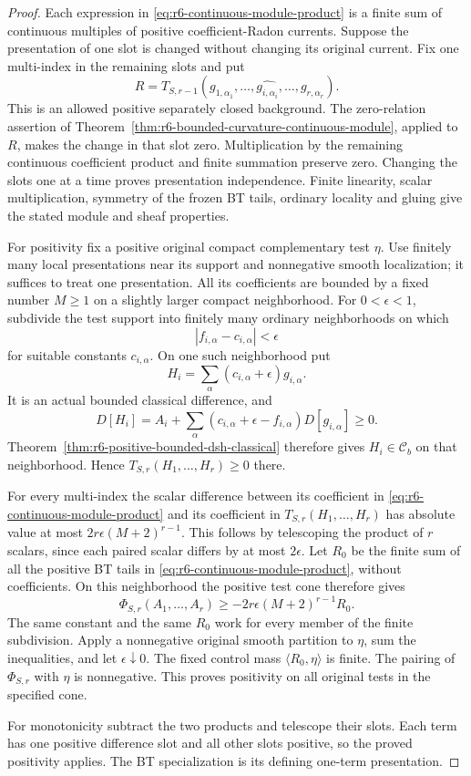 \documentclass[11pt,a4paper]{article}
\numberwithin{equation}{section}
\theoremstyle{definition}
\theoremstyle{remark}
\begin{document}
\begin{proof}
Each expression in \eqref{eq:r6-continuous-module-product} is a finite
sum of continuous multiples of positive coefficient-Radon currents.
Suppose the presentation of one slot is changed without changing its
original current. Fix one multi-index in the remaining slots and put
\[
 R=T_{S,r-1}(g_{1,\alpha_1},\ldots,
              \widehat{g_{i,\alpha_i}},\ldots,g_{r,\alpha_r}).
\]
This is an allowed positive separately closed background. The
zero-relation assertion of
Theorem~\ref{thm:r6-bounded-curvature-continuous-module}, applied to
$R$, makes the change in that slot zero. Multiplication by the
remaining continuous coefficient product and finite summation
preserve zero. Changing the slots one at a time proves presentation
independence. Finite linearity, scalar multiplication, symmetry of
the frozen BT tails, ordinary locality and gluing give the stated
module and sheaf properties.

For positivity fix a positive original compact complementary test
$\eta$. Use finitely many local presentations near its support and
nonnegative smooth localization; it suffices to treat one presentation.
All its coefficients are bounded by a fixed number $M\ge1$ on a
slightly larger compact neighborhood. For $0<\epsilon<1$, subdivide
the test support into finitely many ordinary neighborhoods on which
\[
                    |f_{i,\alpha}-c_{i,\alpha}|<\epsilon
\]
for suitable constants $c_{i,\alpha}$. On one such neighborhood put
\[
 H_i=\sum_\alpha(c_{i,\alpha}+\epsilon)g_{i,\alpha}.
\]
It is an actual bounded classical difference, and
\[
 D[H_i]=A_i+\sum_\alpha(c_{i,\alpha}+\epsilon-f_{i,\alpha})
                                      D[g_{i,\alpha}]\ge0.
\]
Theorem~\ref{thm:r6-positive-bounded-dsh-classical} therefore gives
$H_i\in\mathcal C_b$ on that neighborhood. Hence
$T_{S,r}(H_1,\ldots,H_r)\ge0$ there.

For every multi-index the scalar difference between its coefficient
in \eqref{eq:r6-continuous-module-product} and its coefficient in
$T_{S,r}(H_1,\ldots,H_r)$ has absolute value at most
$2r\epsilon(M+2)^{r-1}$. This follows by telescoping the product of
$r$ scalars, since each paired scalar differs by at most $2\epsilon$.
Let $R_0$ be the finite sum of all the positive BT tails in
\eqref{eq:r6-continuous-module-product}, without coefficients.
On this neighborhood the positive test cone therefore gives
\[
          \Phi_{S,r}(A_1,\ldots,A_r)
                   \ge -2r\epsilon(M+2)^{r-1}R_0.
\]
The same constant and the same $R_0$ work for every member of the
finite subdivision. Apply a nonnegative original smooth partition
to $\eta$, sum the inequalities, and let $\epsilon\downarrow0$.
The fixed control mass $\langle R_0,\eta\rangle$ is finite. The
pairing of $\Phi_{S,r}$ with $\eta$ is nonnegative. This proves
positivity on all original tests in the specified cone.

For monotonicity subtract the two products and telescope their
slots. Each term has one positive difference slot and all other
slots positive, so the proved positivity applies. The BT
specialization is its defining one-term presentation.
\end{proof}
\end{document}
